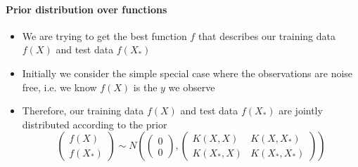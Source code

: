 \documentclass[12pt]{article}
\begin{document}
\paragraph{Prior distribution over functions}
\begin{itemize}
    \item We are trying to get the best function $f$ that describes our training data $f(X)$ and test data $f(X_*)$
    \item Initially we consider the simple special case where the observations are noise free, i.e. we know $f(X)$ is the $y$ we observe
    \item Therefore, our training data $f(X)$ and test data $f(X_*)$ are jointly distributed according to the prior
\begin{equation}
    \begin{pmatrix}
        f(X) \\ f(X_*)
    \end{pmatrix} \sim N\left(
    \begin{pmatrix}
        0 \\ 0
    \end{pmatrix},
    \begin{pmatrix}
        K(X,X) & K(X,X_*) \\ K(X_*,X) & K(X_*,X_*)
    \end{pmatrix}
    \right)
\end{equation}
\end{itemize}
\end{document}
